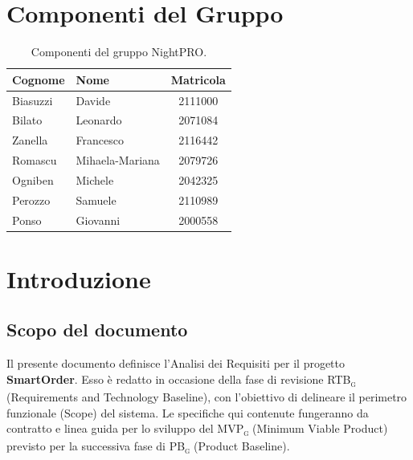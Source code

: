 \documentclass[a4paper, 11pt, oneside]{scrartcl} %
\begin{document}
\newpage
\tableofcontents %
\listoffigures
\listoftables
\pagestyle{fancy}

\newpage
\section*{Componenti del Gruppo}

\begin{table}[H]
    \centering
    \renewcommand{\arraystretch}{1.2}
    \begin{tabular}{@{}llc@{}}
        \toprule
        \textbf{Cognome} & \textbf{Nome}   & \textbf{Matricola} \\
        \midrule
        Biasuzzi         & Davide          & 2111000            \\
        Bilato           & Leonardo        & 2071084            \\
        Zanella          & Francesco       & 2116442            \\
        Romascu          & Mihaela-Mariana & 2079726            \\
        Ogniben          & Michele         & 2042325            \\
        Perozzo          & Samuele         & 2110989            \\
        Ponso            & Giovanni        & 2000558            \\
        \bottomrule
    \end{tabular}
    \caption{Componenti del gruppo NightPRO.}
\end{table}

\newpage
\section{Introduzione}

\subsection{Scopo del documento}
Il presente documento definisce l'Analisi dei Requisiti per il progetto \textbf{SmartOrder}. Esso è redatto in occasione della fase di revisione RTB\textsubscript{\textsc{g}} (Requirements and Technology Baseline), con l'obiettivo di delineare il perimetro funzionale (Scope) del sistema. Le specifiche qui contenute fungeranno da contratto e linea guida per lo sviluppo del MVP\textsubscript{\textsc{g}} (Minimum Viable Product) previsto per la successiva fase di PB\textsubscript{\textsc{g}} (Product Baseline).
\end{document}
